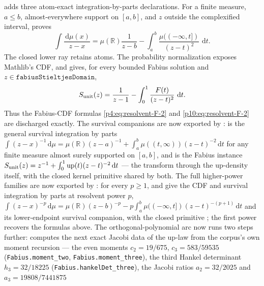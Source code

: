 \documentclass[11pt,oneside]{article}
\theoremstyle{definition}
\theoremstyle{remark}
\newcommand{\Up}{\operatorname{up}}
\newcommand{\R}{\mathbb R}
\newcommand{\dd}{\,\mathrm d}
\newcommand{\1}{\mathbf 1}
\begin{document}
\begin{statusbox}
 adds three atom-exact integration-by-parts declarations.
For a finite measure, \(a\leq b\), almost-everywhere support on \([a,b]\), and
\(z\) outside the complexified interval,
proves
\[
 \int\frac{\dd\mu(x)}{z-x}
 =\mu(\R)\frac1{z-b}
  -\int_a^b\frac{\mu((-\infty,t])}{(z-t)^2}\,\dd t .
\]
The closed lower ray retains atoms.  The probability normalization
 exposes
Mathlib's CDF, and
gives, for every bounded Fabius solution and
\(z\in\mathtt{fabiusStieltjesDomain}\),
\[
 S_{\rm unit}(z)=\frac1{z-1}
  -\int_0^1\frac{F(t)}{(z-t)^2}\,\dd t .
\]
Thus the Fabius-CDF formulas \eqref{p4:eq:resolvent-F-2} and
\eqref{p10:eq:resolvent-F-2} are discharged exactly.  The survival companions are now
exported by : 
is the general survival integration by parts
\(\int(z-x)^{-1}\dd\mu=\mu(\R)(z-a)^{-1}+\int_a^b\mu((t,\infty))(z-t)^{-2}\dd t\) for any
finite measure almost surely supported on \([a,b]\), and
 is the
Fabius instance \(S_{\rm unit}(z)=z^{-1}+\int_0^1\Up(t)(z-t)^{-2}\dd t\) --- the transform
through the up-density itself, with the closed kernel primitive
 shared by both.  The full higher-power
families are now exported by : for every $p\ge1$,
and 
give the CDF and survival integration by parts at resolvent power $p$,
\(\int(z-x)^{-p}\dd\mu=\mu(\R)(z-b)^{-p}-p\int_a^b\mu((-\infty,t])(z-t)^{-(p+1)}\dd t\)
and its lower-endpoint survival companion, with the closed primitive
; the first power recovers the formulas
above.  The orthogonal-polynomial arc now runs two steps further:
 computes the next exact Jacobi data of the
up-law from the corpus's own moment recursion --- the even moments
\(c_2=19/675\), \(c_3=583/59535\) (\nolinkurl{Fabius.moment\_two}, \nolinkurl{Fabius.moment\_three}),
the third Hankel determinant \(h_3=32/18225\) (\nolinkurl{Fabius.hankelDet\_three}),
the Jacobi ratios \(a_2=32/2025\) and \(a_3=19808/7441875\)

\end{statusbox}
\end{document}
